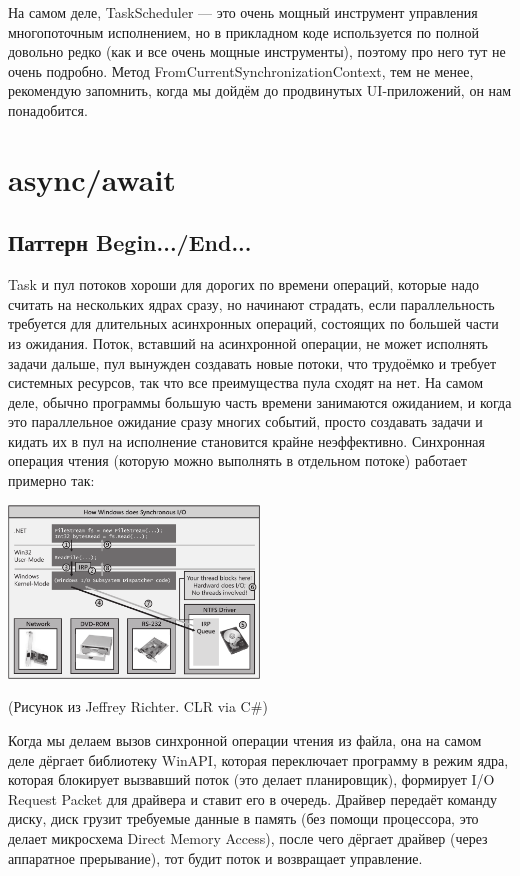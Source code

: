 \documentclass{../../text-style}
\begin{document}
На самом деле, TaskScheduler --- это очень мощный инструмент управления многопоточным исполнением, но в прикладном коде используется по полной довольно редко (как и все очень мощные инструменты), поэтому про него тут не очень подробно. Метод FromCurrentSynchronizationContext, тем не менее, рекомендую запомнить, когда мы дойдём до продвинутых UI-приложений, он нам понадобится.

\section{async/await}

\subsection{Паттерн Begin.../End...}

Task и пул потоков хороши для дорогих по времени операций, которые надо считать на нескольких ядрах сразу, но начинают страдать, если параллельность требуется для длительных асинхронных операций, состоящих по большей части из ожидания. Поток, вставший на асинхронной операции, не может исполнять задачи дальше, пул вынужден создавать новые потоки, что трудоёмко и требует системных ресурсов, так что все преимущества пула сходят на нет. На самом деле, обычно программы большую часть времени занимаются ожиданием, и когда это параллельное ожидание сразу многих событий, просто создавать задачи и кидать их в пул на исполнение становится крайне неэффективно. Синхронная операция чтения (которую можно выполнять в отдельном потоке) работает примерно так:

\begin{center}
    \includegraphics[width=0.5\textwidth]{windowsSynchronousIO.png}

    \begin{footnotesize}(Рисунок из Jeffrey Richter. CLR via C\#)\end{footnotesize}
\end{center}

Когда мы делаем вызов синхронной операции чтения из файла, она на самом деле дёргает библиотеку WinAPI, которая переключает программу в режим ядра, которая блокирует вызвавший поток (это делает планировщик), формирует I/O Request Packet для драйвера и ставит его в очередь. Драйвер передаёт команду диску, диск грузит требуемые данные в память (без помощи процессора, это делает микросхема Direct Memory Access), после чего дёргает драйвер (через аппаратное прерывание), тот будит поток и возвращает управление.
\end{document}
